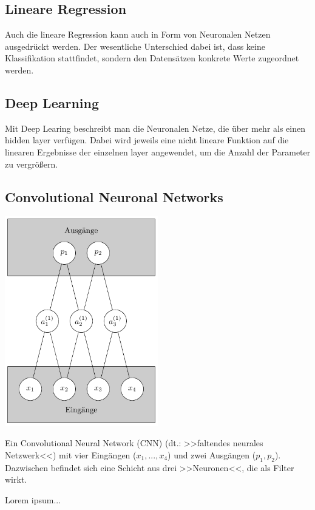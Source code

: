 \subsection{Lineare Regression}

Auch die lineare Regression kann auch in Form von Neuronalen Netzen ausgedrückt werden. Der wesentliche Unterschied dabei ist, dass keine Klassifikation stattfindet, sondern den Datensätzen konkrete Werte zugeordnet werden.


\subsection{Deep Learning}

Mit Deep Learing beschreibt man die Neuronalen Netze, die über mehr als einen hidden layer verfügen. Dabei wird jeweils eine nicht lineare Funktion auf die linearen Ergebnisse der einzelnen layer angewendet, um die Anzahl der Parameter zu vergrößern.

\subsection{Convolutional Neuronal Networks}

\begin{dsafigure}
	\begin{center}
		\includegraphics[width=0.5\textwidth]{Figure_ConvNN}
		\caption{Ein Convolutional Neural Network (CNN) (dt.: >>faltendes neurales Netzwerk<<) mit vier Eingängen ($x_1, ..., x_4$) und zwei Ausgängen ($p_1, p_2$). Dazwischen befindet sich eine Schicht aus drei >>Neuronen<<, die als Filter wirkt.}
		\label{FigConvNN}
	\end{center}
\end{dsafigure}

Lorem ipsum...